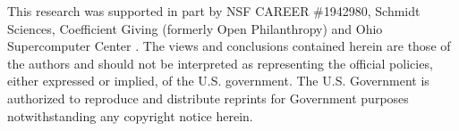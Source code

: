 \documentclass{article} %
\begin{document}
This research was supported in part by NSF CAREER \#1942980, Schmidt Sciences, Coefficient Giving (formerly Open Philanthropy) and Ohio Supercomputer Center \citep{Ohio_Supercomputer_Center1987-dl}. The views and conclusions contained herein are those of the authors and should not be interpreted as representing the official policies, either expressed or implied, of the U.S. government. The U.S. Government is authorized to reproduce and distribute reprints for Government purposes notwithstanding any copyright notice herein.




\appendix

\end{document}
